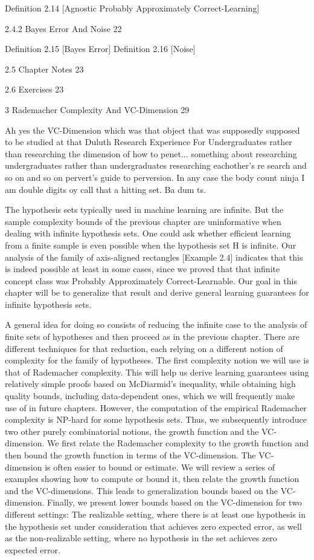 Definition 2.14 [Agnostic Probably Approximately Correct-Learning]

2.4.2 Bayes Error And Noise 22

Definition 2.15 [Bayes Error]
Definition 2.16 [Noise]

2.5 Chapter Notes 23



2.6 Exercises 23



3 Rademacher Complexity And VC-Dimension 29

Ah yes the VC-Dimension which was that object that was supposedly supposed to be studied at that Duluth Research Experience For Undergraduates rather than researching the dimension of how to penet... something about researching undergraduates rather than undergraduates researching eachother's re search and so on and so on pervert's guide to perversion. In any case the body count ninja I am double digits oy call that a hitting set. Ba dum ts.

The hypothesis sets typically used in machine learning are infinite. But the sample complexity bounds of the previous chapter are uninformative when dealing with infinite hypothesis sets. One could ask whether efficient learning from a finite sample is even possible when the hypothesis set H is infinite. Our analysis of the family of axis-aligned rectangles [Example 2.4] indicates that this is indeed possible at least in some cases, since we proved that that infinite concept class was Probably Approximately Correct-Learnable. Our goal in this chapter will be to generalize that result and derive general learning guarantees for infinite hypothesis sets.

A general idea for doing so consists of reducing the infinite case to the analysis of finite sets of hypotheses and then proceed as in the previous chapter. There are different techniques for that reduction, each relying on a different notion of complexity for the family of hypotheses. The first complexity notion we will use is that of Rademacher complexity. This will help us derive learning guarantees using relatively simple proofs based on McDiarmid's inequality, while obtaining high quality bounds, including data-dependent ones, which we will frequently make use of in future chapters. However, the computation of the empirical Rademacher complexity is NP-hard for some hypothesis sets. Thus, we subsequently introduce two other purely combinatorial notions, the growth function and the VC-dimension. We first relate the Rademacher complexity to the growth function and then bound the growth function in terms of the VC-dimension. The VC-dimension is often easier to bound or estimate. We will review a series of examples showing how to compute or bound it, then relate the growth function and the VC-dimensions. This leads to generalization bounds based on the VC-dimension. Finally, we present lower bounds based on the VC-dimension for two different settings: The realizable setting, where there is at least one hypothesis in the hypothesis set under consideration that achieves zero expected error, as well as the non-realizable setting, where no hypothesis in the set achieves zero expected error.

